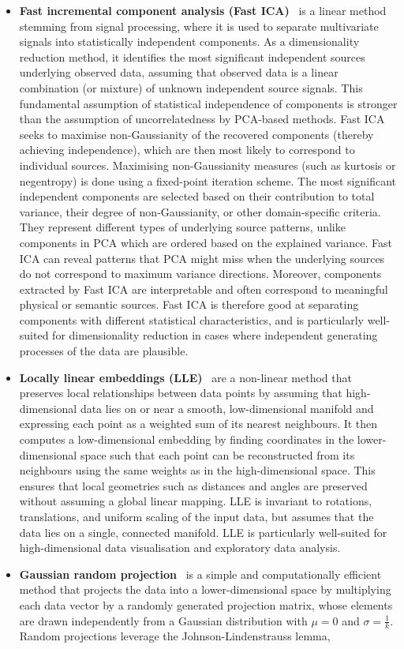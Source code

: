 \begin{itemize}
    \item \textbf{Fast incremental component analysis (Fast ICA)}~\citep{HyvOja00} is a linear method stemming from signal processing, where it is used to separate multivariate signals into statistically independent components. As a dimensionality reduction method, it identifies the most significant independent sources underlying observed data, assuming that observed data is a linear combination (or mixture) of unknown independent source signals. This fundamental assumption of statistical independence of components is stronger than the assumption of uncorrelatedness by PCA-based methods. Fast ICA seeks to maximise non-Gaussianity of the recovered components (thereby achieving independence), which are then most likely to correspond to individual sources. Maximising non-Gaussianity measures (such as kurtosis or negentropy) is done using a fixed-point iteration scheme. The most significant independent components are selected based on their contribution to total variance, their degree of non-Gaussianity, or other domain-specific criteria. They represent different types of underlying source patterns, unlike components in PCA which are ordered based on the explained variance. Fast ICA can reveal patterns that PCA might miss when the underlying sources do not correspond to maximum variance directions. Moreover, components extracted by Fast ICA are interpretable and often correspond to meaningful physical or semantic sources. Fast ICA is therefore good at separating components with different statistical characteristics, and is particularly well-suited for dimensionality reduction in cases where independent generating processes of the data are plausible.

    \item \textbf{Locally linear embeddings (LLE)}~\citep{RowSau00} are a non-linear method that preserves local relationships between data points by assuming that high-dimensional data lies on or near a smooth, low-dimensional manifold and expressing each point as a weighted sum of its nearest neighbours. It then computes a low-dimensional embedding by finding coordinates in the lower-dimensional space such that each point can be reconstructed from its neighbours using the same weights as in the high-dimensional space. This ensures that local geometries such as distances and angles are preserved without assuming a global linear mapping. LLE is invariant to rotations, translations, and uniform scaling of the input data, but assumes that the data lies on a single, connected manifold. LLE is particularly well-suited for high-dimensional data visualisation and exploratory data analysis.
    \item \textbf{Gaussian random projection}~\citep{Achlioptas01} is a simple and computationally efficient method that projects the data into a lower-dimensional space by multiplying each data vector by a randomly generated projection matrix, whose elements are drawn independently from a Gaussian distribution with $\mu=0$ and $\sigma=\frac{1}{k}$. Random projections leverage the Johnson-Lindenstrauss lemma, 


\end{itemize}
